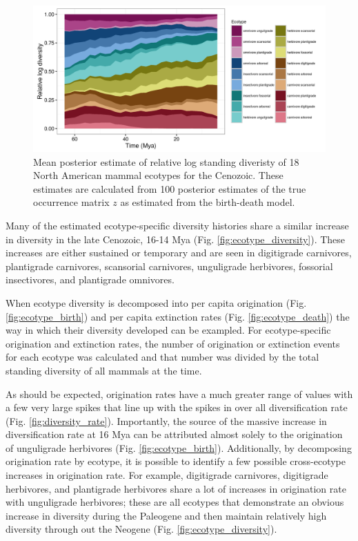 \afterpage{\clearpage}
\begin{figure}[p]
  \centering
  \includegraphics[width=\textwidth,height=\textheight,keepaspectratio=true]{chapter_coping/figure/relative_diversity}
  \caption[Relative mammal ecotype log-diversity for the Cenozoic]{Mean posterior estimate of relative log standing diveristy of 18 North American mammal ecotypes for the Cenozoic. These estimates are calculated from 100 posterior estimates of the true occurrence matrix \(z\) as estimated from the birth-death model.}
  \label{fig:ecotype_relative}
\end{figure}


Many of the estimated ecotype-specific diversity histories share a similar increase in diversity in the late Cenozoic, 16-14 Mya (Fig. \ref{fig:ecotype_diversity}). These increases are either sustained or temporary and are seen in digitigrade carnivores, plantigrade carnivores, scansorial carnivores, unguligrade herbivores, fossorial insectivores, and plantigrade omnivores.

When ecotype diversity is decomposed into per capita origination (Fig. \ref{fig:ecotype_birth}) and per capita extinction rates (Fig. \ref{fig:ecotype_death}) the way in which their diversity developed can be exampled. For ecotype-specific origination and extinction rates, the number of origination or extinction events for each ecotype was calculated and that number was divided by the total standing diversity of all mammals at the time. 

As should be expected, origination rates have a much greater range of values with a few very large spikes that line up with the spikes in over all diversification rate (Fig. \ref{fig:diversity_rate}). Importantly, the source of the massive increase in diversification rate at 16 Mya can be attributed almost solely to the origination of unguligrade herbivores (Fig. \ref{fig:ecotype_birth}). Additionally, by decomposing origination rate by ecotype, it is possible to identify a few possible cross-ecotype increases in origination rate. For example, digitigrade carnivores, digitigrade herbivores, and plantigrade herbivores share a lot of increases in origination rate with unguligrade herbivores; these are all ecotypes that demonstrate an obvious increase in diversity during the Paleogene and then maintain relatively high diversity through out the Neogene (Fig. \ref{fig:ecotype_diversity}).

